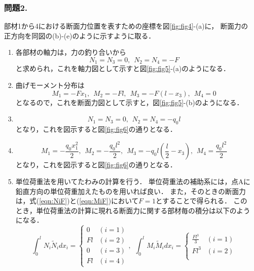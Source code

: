 \documentclass[10pt,a4j]{jarticle}
\begin{document}
\subsubsection*{問題2.}
部材1から4における断面力位置を表すための座標を図\ref{fig:fig4}-(a)に，
断面力の正方向を同図の(b)-(e)のように示すように取る．
\begin{enumerate}
\item
	各部材の軸力は，力の釣り合いから
	\begin{equation}
		N_1=N_3=0, \ \ N_2=N_4=-F
		\label{eqn:NiF}
	\end{equation}
	と求められ，これを軸力図として示すと図\ref{fig:fig5}-(a)のようになる．
\item
	曲げモーメント分布は
	\begin{equation}
		M_1=-Fx_1, \ \ M_2=-Fl, \ \ M_3=-F(l-x_3), \ \ M_4=0
		\label{eqn:MiF}
	\end{equation}
	となるので，これを断面力図として示すと，図\ref{fig:fig5}-(b)のようになる．
\item
	\begin{equation}
		N_1=N_3=0, \ \ N_2=N_4=-q_0l
		\label{eqn:Niq}
	\end{equation}
	となり，これを図示すると図\ref{fig:fig6}の通りとなる．
\item
	\begin{equation}
		M_1=-\frac{q_0x_1^2}{2}, \ \ M_2=-\frac{q_0l^2}{2}, \ \ M_3=-q_0l\left(\frac{l}{2}-x_3\right), \ \ M_4=\frac{q_0l^2}{2}
		\label{eqn:Miq}
	\end{equation}
	となり，これを図示すると図\ref{fig:fig6}の通りとなる．
\item
	単位荷重法を用いてたわみの計算を行う．
	単位荷重法の補助系には，点Aに鉛直方向の単位荷重加えたものを用いれば良い．
	また，そのときの断面力は，式(\ref{eqn:NiF})と(\ref{eqn:MiF})において$F=1$とすることで得られる．
	このとき，単位荷重法の計算に現れる断面力に関する部材毎の積分は以下のようになる．
	\begin{equation}
		\int_0^l 
			N_i \tilde{N}_i dx_i = 
		\left\{
		\begin{array}{cc}
			0 & (i=1) \\
			Fl& (i=2) \\
			0 & (i=3) \\
			Fl & (i=4)
		\end{array}
		\right.
		, \ \
		\int_0^l 
			M_i \tilde{M}_i dx_i = 
		\left\{
		\begin{array}{cc}
			\frac{Fl^3}{3} & (i=1) \\
			Fl^3 & (i=2) \\

\end{array}
\end{equation}
\end{enumerate}
\end{document}
